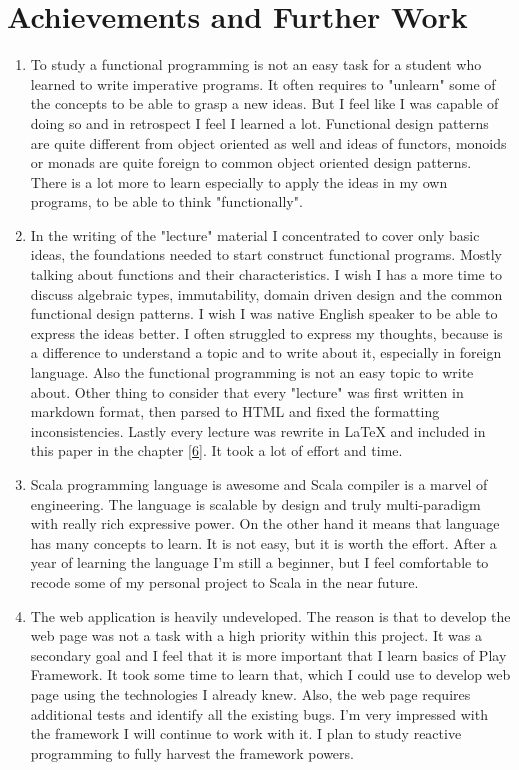 \documentclass[12pt,twoside,a4paper]{report}
\begin{document}
\section{Achievements and Further Work}\label{7.2}
\begin{enumerate}\itemsep1pt \parskip0pt 
\item To study a functional programming is not an easy task for a student who learned to write imperative programs. It often requires to "unlearn" some of the concepts to be able to grasp a new ideas. But I feel like I was capable of doing so and in retrospect I feel I learned a lot. Functional design patterns are quite different from object oriented as well and ideas of functors, monoids or monads are quite foreign to common object oriented design patterns. There is a lot more to learn especially to apply the ideas in my own programs, to be able to think "functionally".
\item In the writing of the "lecture" material I concentrated to cover only basic ideas, the foundations needed to start construct functional programs. Mostly talking about functions and their characteristics. I wish I has a more time to discuss algebraic types, immutability, domain driven design and the common functional design patterns. I wish I was native English speaker to be able to express the ideas better. I often struggled to express my thoughts, because is a difference to understand a topic and to write about it, especially in foreign language. Also the functional programming is not an easy topic to write about. Other thing to consider that every "lecture" was first written in markdown format, then parsed to HTML and fixed the formatting inconsistencies. Lastly every lecture was rewrite in LaTeX and included in this paper in the chapter \ref{6}. It took a lot of effort and time.
\item Scala programming language is awesome and Scala compiler is a marvel of engineering. The language is scalable by design and truly multi-paradigm with really rich expressive power. On the other hand it means that language has many concepts to learn. It is not easy, but it is worth the effort. After a year of learning the language I'm still a beginner, but I feel comfortable to recode some of my personal project to Scala in the near future.
\item The web application is heavily undeveloped. The reason is that to develop the web page was not a task with a high priority within this project. It was a secondary goal and I feel that it is more important that I learn basics of Play Framework. It took some time to learn that, which I could use to develop web page using the technologies I already knew. Also, the web page requires additional tests and identify all the existing bugs.  I'm very impressed with the framework I will continue to work with it. I plan to study reactive programming to fully harvest the framework powers.
\end{enumerate}
\end{document}
